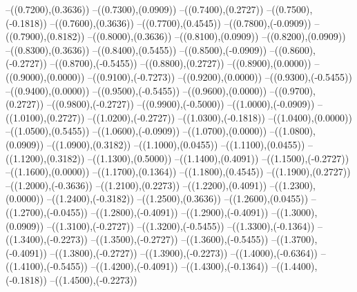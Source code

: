 {	--({\sx*(0.7200)},{\sy*(0.3636)})
	--({\sx*(0.7300)},{\sy*(0.0909)})
	--({\sx*(0.7400)},{\sy*(0.2727)})
	--({\sx*(0.7500)},{\sy*(-0.1818)})
	--({\sx*(0.7600)},{\sy*(0.3636)})
	--({\sx*(0.7700)},{\sy*(0.4545)})
	--({\sx*(0.7800)},{\sy*(-0.0909)})
	--({\sx*(0.7900)},{\sy*(0.8182)})
	--({\sx*(0.8000)},{\sy*(0.3636)})
	--({\sx*(0.8100)},{\sy*(0.0909)})
	--({\sx*(0.8200)},{\sy*(0.0909)})
	--({\sx*(0.8300)},{\sy*(0.3636)})
	--({\sx*(0.8400)},{\sy*(0.5455)})
	--({\sx*(0.8500)},{\sy*(-0.0909)})
	--({\sx*(0.8600)},{\sy*(-0.2727)})
	--({\sx*(0.8700)},{\sy*(-0.5455)})
	--({\sx*(0.8800)},{\sy*(0.2727)})
	--({\sx*(0.8900)},{\sy*(0.0000)})
	--({\sx*(0.9000)},{\sy*(0.0000)})
	--({\sx*(0.9100)},{\sy*(-0.7273)})
	--({\sx*(0.9200)},{\sy*(0.0000)})
	--({\sx*(0.9300)},{\sy*(-0.5455)})
	--({\sx*(0.9400)},{\sy*(0.0000)})
	--({\sx*(0.9500)},{\sy*(-0.5455)})
	--({\sx*(0.9600)},{\sy*(0.0000)})
	--({\sx*(0.9700)},{\sy*(0.2727)})
	--({\sx*(0.9800)},{\sy*(-0.2727)})
	--({\sx*(0.9900)},{\sy*(-0.5000)})
	--({\sx*(1.0000)},{\sy*(-0.0909)})
	--({\sx*(1.0100)},{\sy*(0.2727)})
	--({\sx*(1.0200)},{\sy*(-0.2727)})
	--({\sx*(1.0300)},{\sy*(-0.1818)})
	--({\sx*(1.0400)},{\sy*(0.0000)})
	--({\sx*(1.0500)},{\sy*(0.5455)})
	--({\sx*(1.0600)},{\sy*(-0.0909)})
	--({\sx*(1.0700)},{\sy*(0.0000)})
	--({\sx*(1.0800)},{\sy*(0.0909)})
	--({\sx*(1.0900)},{\sy*(0.3182)})
	--({\sx*(1.1000)},{\sy*(0.0455)})
	--({\sx*(1.1100)},{\sy*(0.0455)})
	--({\sx*(1.1200)},{\sy*(0.3182)})
	--({\sx*(1.1300)},{\sy*(0.5000)})
	--({\sx*(1.1400)},{\sy*(0.4091)})
	--({\sx*(1.1500)},{\sy*(-0.2727)})
	--({\sx*(1.1600)},{\sy*(0.0000)})
	--({\sx*(1.1700)},{\sy*(0.1364)})
	--({\sx*(1.1800)},{\sy*(0.4545)})
	--({\sx*(1.1900)},{\sy*(0.2727)})
	--({\sx*(1.2000)},{\sy*(-0.3636)})
	--({\sx*(1.2100)},{\sy*(0.2273)})
	--({\sx*(1.2200)},{\sy*(0.4091)})
	--({\sx*(1.2300)},{\sy*(0.0000)})
	--({\sx*(1.2400)},{\sy*(-0.3182)})
	--({\sx*(1.2500)},{\sy*(0.3636)})
	--({\sx*(1.2600)},{\sy*(0.0455)})
	--({\sx*(1.2700)},{\sy*(-0.0455)})
	--({\sx*(1.2800)},{\sy*(-0.4091)})
	--({\sx*(1.2900)},{\sy*(-0.4091)})
	--({\sx*(1.3000)},{\sy*(0.0909)})
	--({\sx*(1.3100)},{\sy*(-0.2727)})
	--({\sx*(1.3200)},{\sy*(-0.5455)})
	--({\sx*(1.3300)},{\sy*(-0.1364)})
	--({\sx*(1.3400)},{\sy*(-0.2273)})
	--({\sx*(1.3500)},{\sy*(-0.2727)})
	--({\sx*(1.3600)},{\sy*(-0.5455)})
	--({\sx*(1.3700)},{\sy*(-0.4091)})
	--({\sx*(1.3800)},{\sy*(-0.2727)})
	--({\sx*(1.3900)},{\sy*(-0.2273)})
	--({\sx*(1.4000)},{\sy*(-0.6364)})
	--({\sx*(1.4100)},{\sy*(-0.5455)})
	--({\sx*(1.4200)},{\sy*(-0.4091)})
	--({\sx*(1.4300)},{\sy*(-0.1364)})
	--({\sx*(1.4400)},{\sy*(-0.1818)})
	--({\sx*(1.4500)},{\sy*(-0.2273)})
}
